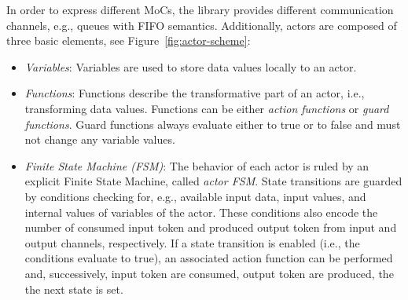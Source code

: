 In order to express different MoCs, the \SysteMoC{} library provides different communication channels, e.g., queues with FIFO semantics. 
Additionally, \SysteMoC{} actors are composed of three basic elements, see Figure~\ref{fig:actor-scheme}:
\begin{itemize}
\item {\em Variables}: Variables are used to store data values locally to an actor.
\item {\em Functions}: Functions describe the transformative part of an actor, i.e., transforming data values.  
Functions can be either \emph{action functions} or \emph{guard functions}. 
Guard functions always evaluate either to true or to false and must not change any variable values.
\item {\em Finite State Machine (FSM)}:
The behavior of each actor is ruled by an explicit Finite State Machine, called \emph{actor FSM}.
State transitions are guarded by conditions checking for, e.g., available input data, input values, and internal values of variables of the actor. 
These conditions also encode the number of consumed input token and produced output token from input and output channels, respectively.
If a state transition is enabled (i.e., the conditions evaluate to true), an associated action function can be performed and, successively, input token are consumed, output token are produced, the the next state is set. 
\end{itemize}

